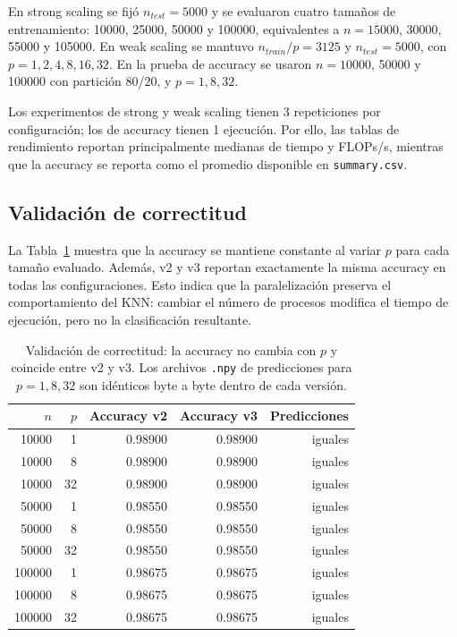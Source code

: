 \documentclass[11pt,a4paper]{article}
\begin{document}
En strong scaling se fijó $n_{test}=5000$ y se evaluaron cuatro tamaños de entrenamiento:
10000, 25000, 50000 y 100000, equivalentes a $n=15000$, 30000, 55000 y 105000. En weak scaling
se mantuvo $n_{train}/p=3125$ y $n_{test}=5000$, con $p=1,2,4,8,16,32$. En la prueba de accuracy
se usaron $n=10000$, 50000 y 100000 con partición 80/20, y $p=1,8,32$.

Los experimentos de strong y weak scaling tienen 3 repeticiones por configuración; los de accuracy
tienen 1 ejecución. Por ello, las tablas de rendimiento reportan principalmente medianas de
tiempo y FLOPs/s, mientras que la accuracy se reporta como el promedio disponible en
\texttt{summary.csv}.

\subsection{Validación de correctitud}

La Tabla~\ref{tab:accuracy-validation} muestra que la accuracy se mantiene constante al variar
$p$ para cada tamaño evaluado. Además, v2 y v3 reportan exactamente la misma accuracy en todas
las configuraciones. Esto indica que la paralelización preserva el comportamiento del KNN: cambiar
el número de procesos modifica el tiempo de ejecución, pero no la clasificación resultante.

\begin{table}[H]
\centering
\begin{tabular}{rrrrr}
\toprule
$n$ & $p$ & Accuracy v2 & Accuracy v3 & Predicciones \\
\midrule
10000 & 1  & 0.98900 & 0.98900 & iguales \\
10000 & 8  & 0.98900 & 0.98900 & iguales \\
10000 & 32 & 0.98900 & 0.98900 & iguales \\
50000 & 1  & 0.98550 & 0.98550 & iguales \\
50000 & 8  & 0.98550 & 0.98550 & iguales \\
50000 & 32 & 0.98550 & 0.98550 & iguales \\
100000 & 1  & 0.98675 & 0.98675 & iguales \\
100000 & 8  & 0.98675 & 0.98675 & iguales \\
100000 & 32 & 0.98675 & 0.98675 & iguales \\
\bottomrule
\end{tabular}
\caption{Validación de correctitud: la accuracy no cambia con $p$ y coincide entre v2 y v3. Los archivos \texttt{.npy} de predicciones para $p=1,8,32$ son idénticos byte a byte dentro de cada versión.}
\label{tab:accuracy-validation}
\end{table}
\end{document}
